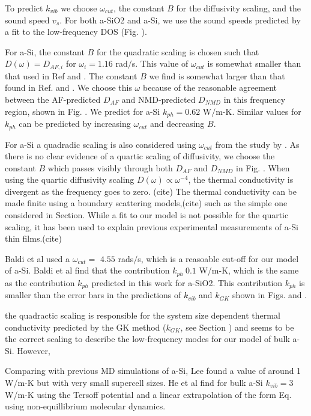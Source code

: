 \documentclass[aps,prb,twocolumn,superscriptaddress,footinbib,amsmath,amssymb,floatfix]{revtex4}
\begin{document}
To predict $k_{vib}$ we choose $\omega_{cut}$, 
the constant $B$ for the diffusivity scaling, and the sound speed 
$v_{s}$. For both a-SiO2 and a-Si, we use the sound speeds predicted 
by a fit to the low-frequency DOS (Fig. ). 

For a-Si, the constant $B$ for the quadratic scaling is chosen such 
that $D(\omega) = D_{AF,i}$ for $\omega_i=1.16$ rad$/$s. This value 
of $\omega_{cut}$ is somewhat smaller than that used in Ref and . 
The constant $B$ we find is somewhat larger than that found in 
Ref. and . We choose this $\omega$ because of the reasonable agreement 
between the AF-predicted $D_{AF}$ and NMD-predicted $D_{NMD}$ in this 
frequency region, shown in Fig. . We predict for a-Si $k_{ph} = 0.62$ 
W$/$m-K. Similar values for $k_{ph}$ can be predicted by increasing 
$\omega_{cut}$ and decreasing $B$. 

For a-Si a quadradic scaling is also 
considered using $\omega_{cut}$ from the study by . As there is no clear 
evidence of a quartic scaling of diffusivity, we choose the constant 
$B$ which passes visibly through both $D_{AF}$ and $D_{NMD}$ in Fig. . 
When using the quartic diffusivity scaling $D(\omega)\propto\omega^{-4}$, 
the thermal conductivity is divergent as the frequency goes to zero.
(cite) The thermal conductivity can be made finite using a boundary 
scattering models,(cite) such as the simple one considered in Section. 
While a fit to our model is not possible for the quartic scaling, 
it has been used to explain previous experimental measurements of 
a-Si thin films.(cite)

Baldi et al used a $\omega_{cut}=$ $4.55$ rads$/$s, which is a reasoable 
cut-off for our model of a-Si.\cite{baldi_thermal_2008} 
Baldi et al find that the contribution $k_{ph}~0.1$ W/m-K, which is 
the same as the contribution $k_{ph}$ predicted in this work for 
a-SiO2. This contribution 
$k_{ph}$ is smaller than the error bars in the predictions of $k_{vib}$ 
and $k_{GK}$ shown in Figs. and .  

the quadractic scaling 
is responsible for the system size dependent thermal conductivity 
predicted by the GK method ($k_{GK}$, see Section ) and seems to be 
the correct scaling to describe the low-frequency modes for our model 
of bulk a-Si. However,

Comparing with previous MD simulations of a-Si, 
Lee found a value of around 1 W/m-K 
but with very small supercell sizes.\cite{lee_molecular-dynamics_1991}
He et al find for bulk a-Si $k_{vib} = 3$ W/m-K using the Tersoff 
potential and a linear extrapolation of the form Eq. using 
non-equillibrium molecular dynamics. 
 
\end{document}
